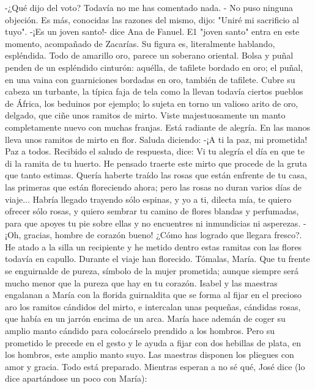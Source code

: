 \documentclass[12pt]{book} %
\begin{document}
-¿Qué dijo del voto? Todavía no me has comentado nada. 
- No puso ninguna objeción. Es más, conocidas las razones del mismo, dijo: "Uniré mi sacrificio al tuyo". 
-¡Es un joven santo!- dice Ana de Fanuel. 
E1 "joven santo" entra en este momento, acompañado de Zacarías. 
Su figura es, literalmente hablando, espléndida. Todo de amarillo oro, parece un soberano oriental. Bolsa y puñal 
penden de un espléndido cinturón: aquélla, de tafilete bordado en oro; el puñal, en una vaina con guarniciones bordadas en oro, también de tafilete. Cubre su cabeza un turbante, la típica faja de tela como la llevan todavía ciertos pueblos de África, los beduinos por ejemplo; lo sujeta en torno un valioso arito de oro, delgado, que ciñe unos ramitos de mirto. Viste majestuosamente un manto completamente nuevo con muchas franjas. Está radiante de alegría. En las manos lleva unos ramitos de mirto en flor. 
Saluda diciendo: 
-¡A ti la paz, mi prometida! Paz a todos. 
Recibido el saludo de respuesta, dice: 
Vi tu alegría el día en que te di la ramita de tu huerto. He pensado traerte este mirto que procede de la gruta que 
tanto estimas. Quería haberte traído las rosas que están enfrente de tu casa, las primeras que están floreciendo ahora; pero las rosas no duran varios días de viaje... Habría llegado trayendo sólo espinas, y yo a ti, dilecta mía, te quiero ofrecer sólo rosas, y quiero sembrar tu camino de flores blandas y perfumadas, para que apoyes tu pie sobre ellas y no encuentres ni inmundicias ni asperezas. 
-¡Oh, gracias, hombre de corazón bueno! ¿Cómo has logrado que llegara fresco?. 
He atado a la silla un recipiente y he metido dentro estas ramitas con las flores todavía en capullo. Durante el viaje han florecido. Tómalas, María. Que tu frente se enguirnalde de pureza, símbolo de la mujer prometida; aunque siempre será mucho menor que la pureza que hay en tu corazón. 
Isabel y las maestras engalanan a María con la florida guirnaldita que se forma al fijar en el precioso aro los ramitos 
cándidos del mirto, e intercalan unas pequeñas, cándidas rosas, que había en un jarrón encima de un arca. 
María hace ademán de coger su amplio manto cándido para colocárselo prendido a los hombros. Pero su prometido le 
precede en el gesto y le ayuda a fijar con dos hebillas de plata, en los hombros, este amplio manto suyo. Las maestras disponen los pliegues con amor y gracia. 
Todo está preparado. Mientras esperan a no sé qué, José dice (lo dice apartándose un poco con María): 
\end{document}

